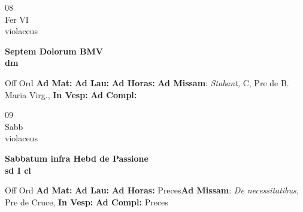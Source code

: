 \documentclass[10pt, openany]{book}
\begin{document}
        \begin{center}
            \begin{minipage}{3.5in}
                \vspace{2em}
                \begin{minipage}{0.5in}
                    {\Huge 08} \\
                    {\normalsize Fer VI} \\
                    {\normalsize violaceus}
                \end{minipage}
                \begin{minipage}{3.0in}
                    \textbf{ \large Septem Dolorum BMV \\
                    \textnormal{\normalsize dm}} \\ 
                \end{minipage}
                \begin{justify}Off Ord
                    \textbf{Ad Mat: }
                    \textbf{Ad Lau: }
                    \textbf{Ad Horas: }\textbf{Ad Missam}: \textit{Stabant,} C, Pre de B. Maria Virg.,  
                    \textbf{In Vesp: }
                    \textbf{Ad Compl: }
                \end{justify}
            \end{minipage}
        \end{center}
    
        \begin{center}
            \begin{minipage}{3.5in}
                \vspace{2em}
                \begin{minipage}{0.5in}
                    {\Huge 09} \\
                    {\normalsize Sabb} \\
                    {\normalsize violaceus}
                \end{minipage}
                \begin{minipage}{3.0in}
                    \textbf{ \large Sabbatum infra Hebd de Passione \\
                    \textnormal{\normalsize sd I cl}} \\ 
                \end{minipage}
                \begin{justify}Off Ord
                    \textbf{Ad Mat: }
                    \textbf{Ad Lau: }
                    \textbf{Ad Horas: }Preces\textbf{Ad Missam}: \textit{De necessitatibus,} Pre de Cruce,  
                    \textbf{In Vesp: }
                    \textbf{Ad Compl: }Preces
                \end{justify}
            \end{minipage}
        \end{center}
    
\end{document}
